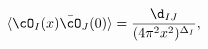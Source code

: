 \begin{equation} \label{2pt}
\langle {\cO}_I (x) \bar\cO_J(0) \rangle = \frac{\d_{IJ}}{(4 \pi^2
x^2)^{\Delta_I}},
\end{equation}

